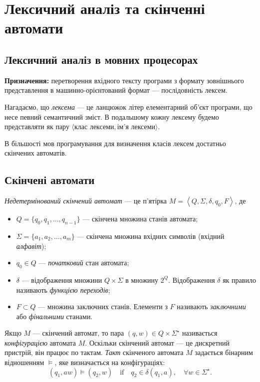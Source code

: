 \setcounter{section}{1}

\section{Лексичний аналіз та скінченні автомати}

\subsection{Лексичний аналіз в мовних процесорах}

\textbf{Призначення:} перетворення вхідного тексту програми з формату зовнішнього представлення в машинно-орієнтований формат --- послідовність лексем. \medskip

Нагадаємо, що \textit{лексема} --- це ланцюжок літер елементарний об'єкт програми, що несе певний семантичний зміст. В подальшому кожну лексему будемо представляти як пару $\langle\text{клас лексеми}, \text{ім'я лексеми}\rangle$. \medskip

В більшості мов програмування для визначення класів лексем достатньо скінчених автоматів.

\subsection{Скінчені автомати}

\textit{Недетермінований скінчений автомат} --- це п'ятірка $M = \left\langle Q, \Sigma, \delta, q_0, F \right\rangle$, де
\begin{itemize}
	\item $Q = \{q_0, q_1, \ldots, q_{n-1}\}$ --- скінчена множина станів автомата;
	\item $\Sigma = \{a_1, a_2, \ldots, a_m\}$ --- скінчена множина вхідних символів (вхідний \textit{алфавіт});
	\item $q_0 \in Q$ --- \textit{початковий} стан автомата;
	\item $\delta$ --- відображення множини $Q \times \Sigma$ в множину $2^Q$. Відображення $\delta$ як правило називають \textit{функцією переходів};
	\item $F \subset Q$ --- множина заключних станів. Елементи з $F$ називають \textit{заключними} або \textit{фінальними} станами.
\end{itemize}

Якщо $M$ --- скінчений автомат, то пара $(q, w) \in Q \times \Sigma^\star$ називається \textit{конфігурацією} автомата $M$. Оскільки скінчений автомат --- це дискретний пристрій, він працює по тактам. \textit{Такт} скінченого автомата $M$ задається бінарним відношенням $\models$, яке визначається на конфігураціях:
\[ (q_1, a w) \models (q_2, w) \quad \text{if} \quad q_2 \in \delta(q_1, a), \quad \forall w \in \Sigma^\star. \]

